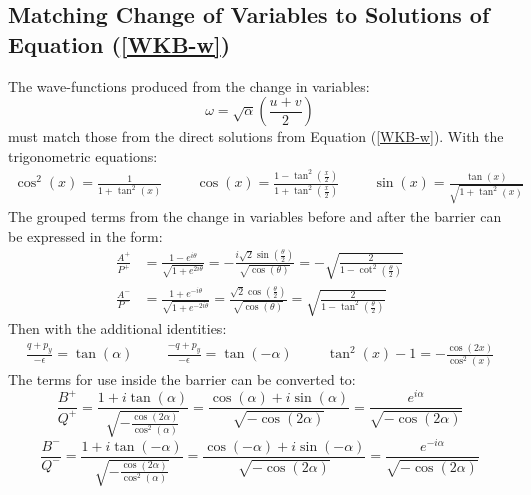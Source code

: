 		\subsection{Matching Change of Variables to Solutions of Equation (\ref{WKB-w})}
		\label{Appendix-Matching-Variables}
		The wave-functions produced from the change in variables:
		\begin{equation}
			\omega=\sqrt{\alpha}\left(\frac{u+v}{2}\right)
		\end{equation}
		must match those from the direct solutions from Equation (\ref{WKB-w}). With the trigonometric equations:
		\begin{align}
			\cos^{2}(x)=\frac{1}{1+\tan^{2}(x)}
			\hspace{1cm}
			\cos(x)=\frac{1-\tan^{2}\left(\frac{x}{2}\right)}{1+\tan^{2}\left(\frac{x}{2}\right)}
			\hspace{1cm}
			\sin(x)=\frac{\tan(x)}{\sqrt{1+\tan^{2}(x)}}
		\end{align}
		The grouped terms from the change in variables before and after the barrier can be expressed in the form:
		\begin{align}
			\frac{A^{+}}{P^{+}}&=\frac{1-e^{i\theta}}{\sqrt{1+e^{2i\theta}}}=-\frac{i\sqrt{2}\sin\left(\frac{\theta}{2}\right)}{\sqrt{\cos(\theta)}}=-\sqrt{\frac{2}{1-\cot^{2}\left(\frac{\theta}{2}\right)}}\\
			\frac{A^{-}}{P^{-}}&=\frac{1+e^{-i\theta}}{\sqrt{1+e^{-2i\theta}}}=\frac{\sqrt{2}\cos\left(\frac{\theta}{2}\right)}{\sqrt{\cos(\theta)}}=\sqrt{\frac{2}{1-\tan^{2}\left(\frac{\theta}{2}\right)}}
		\end{align}
		Then with the additional identities:
		\begin{align}
			\frac{q+p_{y}}{-\epsilon}=\tan(\alpha)
			\hspace{1cm}
			\frac{-q+p_{y}}{-\epsilon}=\tan(-\alpha)
			\hspace{1cm}
			\tan^{2}(x)-1=-\frac{\cos(2x)}{\cos^{2}(x)}
		\end{align}
		The terms for use inside the barrier can be converted to:
		\begin{equation}
			\frac{B^{+}}{Q^{+}}=\frac{1+i\tan(\alpha)}{\sqrt{-\frac{\cos(2\alpha)}{\cos^{2}(\alpha)}}}=\frac{\cos(\alpha)+i\sin(\alpha)}{\sqrt{-\cos(2\alpha)}}=\frac{e^{i\alpha}}{\sqrt{-\cos(2\alpha)}}
		\end{equation}
		\begin{equation}
			\frac{B^{-}}{Q^{-}}=\frac{1+i\tan(-\alpha)}{\sqrt{-\frac{\cos(2\alpha)}{\cos^{2}(\alpha)}}}=\frac{\cos(-\alpha)+i\sin(-\alpha)}{\sqrt{-\cos(2\alpha)}}=\frac{e^{-i\alpha}}{\sqrt{-\cos(2\alpha)}}
		\end{equation}
